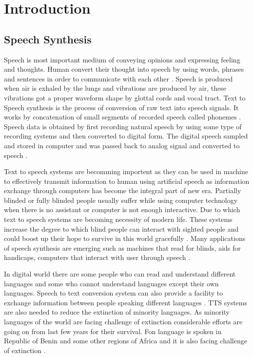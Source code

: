 \chapter{Introduction}

\section{Speech Synthesis}

Speech is most important medium of conveying opinions and expressing feeling and thoughts.
Human convert their thought into speech by using words, phrases and sentences in order to communicate with each other \cite{mumtaz2016break}. 
Speech is produced when air is exhaled by the lungs and vibrations are produced by air, these vibrations got a 
proper waveform shape by glottal cords and vocal tract. Text to Speech synthesis is the process of conversion of raw text into 
speech signals. It works by concatenation of small segments of recorded speech called phonemes \cite{khilari2015review}. Speech data is obtained by first recording natural speech by using
some type of recording systems and then converted to digital form. The digital speech sampled and stored in computer and
was passed back to analog signal and converted to speech \cite{greene1986perception}. 

Text to speech systems are becomming importent as they can be used in machine to effectively transmit
information to human using artificial speech as information exchange through computers has become the integral part of new
era. Partially blinded or fully blinded people usually suffer while using computer technology when there is no assistant or
computer is not enough interactive. Due to which text to speech systems are becoming necessity of modern life. These
systems increase the degree to which blind people can interact with sighted people \cite{klatt1987review} and could boost up
their hope to survive in this world gracefully \cite{aida2010main}. 
Many applications of speech synthesis are emerging such as machines that read for blinds, aids for handicaps, 
computers that interact with user through speech \cite{klatt1982klattalk}.

In digital world there are some people who can read and understand different languages and some who cannot understand
languages except their own languages. Speech to text conversion system can also provide a facility to exchange information
between people speaking different languages \cite{khilari2015review}. TTS systems are also needed to reduce
the extinction of minority languages. As minority languages of the world are facing challenge of extinction considerable
efforts are going on from last few years for their survival. Fon language is spoken in Republic of Benin and some other
regions of Africa and it is also facing challenge of extinction \cite{dagba2014text}.




